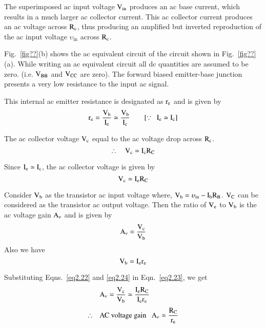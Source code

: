 The superimposed ac input voltage $\textrm{V}_{\text{in}}$ produces an ac base current, which results in a much larger ac collector current. This ac collector current produces an ac voltage across $\textrm{R}_{\textrm{c}}$, thus producing an amplified but inverted reproduction of the ac input voltage $\upsilon_{\text{in}}$ across $\textrm{R}_{\textrm{c}}$.

Fig.~\ref{fig??}(b) shows the ac equivalent circuit of the circuit shown in Fig.~\ref{fig??}(a). While writing an ac equivalent circuit all dc quantities are assumed to be zero. (i.e. $\textrm{V}_{\text{BB}}$ and $\textrm{V}_{\text{CC}}$ are zero). The forward biased emitter-base junction presents a very low resistance to the input ac signal.

This internal ac emitter resistance is designated as $\textrm{r}_{\textrm{e}}$ and is given by 
\begin{equation}
\textrm{r}_{\textrm{e}} = \frac{\textrm{V}_{\textrm{b}}}{\textrm{I}_{\textrm{e}}}\simeq \frac{\textrm{V}_{\textrm{b}}}{\textrm{I}_{\textrm{c}}}\qquad [\because ~~ \textrm{I}_{\textrm{e}}\simeq \textrm{I}_{\textrm{c}}]\label{eq2.20}
\end{equation}

The ac collector voltage $\textrm{V}_{\textrm{c}}$ equal to the ac voltage drop across $\textrm{R}_{\textrm{c}}$.
\begin{equation}
\therefore\quad \textrm{V}_{\textrm{c}} = \textrm{I}_{\textrm{c}}\textrm{R}_{\textrm{C}}\label{eq2.21}
\end{equation}

Since $\textrm{I}_{\textrm{e}}\simeq \textrm{I}_{\textrm{c}}$, the ac collector voltage is given by
\begin{equation}
\textrm{V}_{\textrm{c}}\simeq \textrm{I}_{\textrm{e}}\textrm{R}_{\textrm{C}}\label{eq2.22}
\end{equation}

Consider $\textrm{V}_{\textrm{b}}$ as the transistor ac input voltage where, $\textrm{V}_{\textrm{b}}=\upsilon_{\text{in}}-\textrm{I}_{\textrm{b}}\textrm{R}_{\textrm{B}}$. $\textrm{V}_{\textrm{C}}$ can be considered as the transistor ac output voltage. Then the ratio of $\textrm{V}_{\textrm{e}}$ to $\textrm{V}_{\textrm{b}}$ is the ac voltage gain $\textrm{A}_{\nu}$ and is given by
\begin{equation}
\textrm{A}_{\nu}=\frac{\textrm{V}_{\textrm{c}}}{\textrm{V}_{\textrm{b}}}\label{eq2.23}
\end{equation}
Also we have
\begin{equation}
\textrm{V}_{\textrm{b}}=\textrm{I}_{\textrm{e}}\textrm{r}_{\textrm{e}}\label{eq2.24}
\end{equation}

Substituting Eqns.~\eqref{eq2.22} and \eqref{eq2.24} in Eqn.~\eqref{eq2.23}, we get
\begin{align}
& \textrm{A}_{\nu} = \frac{\textrm{V}_{\textrm{c}}}{\textrm{V}_{\textrm{b}}}\simeq \frac{\textrm{I}_{\textrm{e}}\textrm{R}_{\textrm{C}}}{\textrm{I}_{\textrm{e}}\textrm{r}_{\textrm{e}}}\notag\\[3pt]
\therefore\quad & \text{AC voltage gain~~ } \textrm{A}_{\nu}\simeq \frac{\textrm{R}_{\textrm{C}}}{\textrm{r}_{\textrm{e}}}\label{eq2.25}
\end{align}

